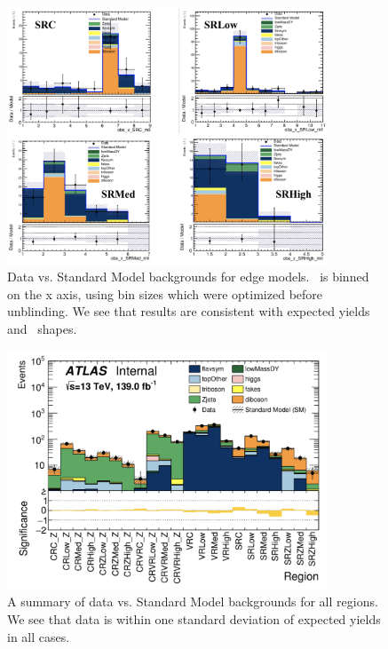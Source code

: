 \begin{figure}[htbp]
    \centering
    \includegraphics[width=0.85\textwidth]{Images/SUSY/edge_results.png}
    \caption{Data vs. Standard Model backgrounds for edge models. \mll\ is binned on the x axis, using bin sizes which were optimized before unblinding. We see that results are consistent with expected yields and \mll\ shapes.}
    \label{fig:edge_results}
\end{figure}

\begin{figure}[htbp]
    \centering
    \includegraphics[width=0.85\textwidth]{Images/SUSY/all_results.png}
    \caption{A summary of data vs. Standard Model backgrounds for all regions. We see that data is within one standard deviation of expected yields in all cases.}
    \label{fig:all_results}
\end{figure}